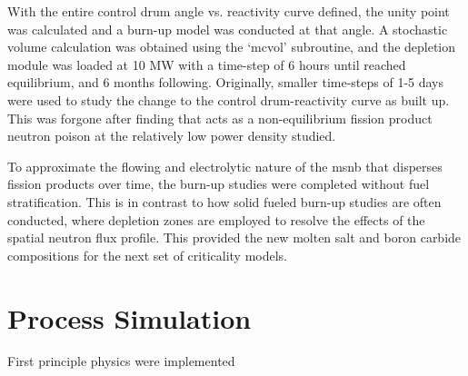  With the entire control drum angle vs. reactivity curve defined, the unity point was calculated and a burn-up model was conducted at that angle. A stochastic volume calculation was obtained using the `mcvol' subroutine, and the depletion module was loaded at 10 MW with a time-step of 6 hours until \Xe reached equilibrium, and 6 months following. Originally, smaller time-steps of 1-5 days were used to study the change to the control drum-reactivity curve as \Sm built up. This was forgone after finding that \Sm acts as a non-equilibrium fission product neutron poison at the relatively low power density studied. 
 
 To approximate the flowing and electrolytic nature of the \acs{msnb} that disperses fission products over time, the burn-up studies were completed without fuel stratification. This is in contrast to how solid fueled burn-up studies are often conducted, where depletion zones are employed to resolve the effects of the spatial neutron flux profile. This provided the new molten salt and boron carbide compositions for the next set of criticality models.



\section{Process Simulation}\label{Section:Python}
First principle physics were implemented 